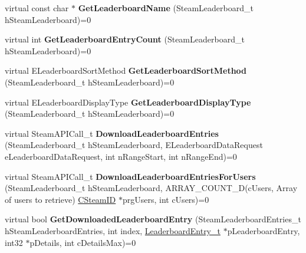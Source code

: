 \begin{DoxyCompactItemize}
\item 
\mbox{\label{class_i_steam_user_stats_a5b73997ec50e5789cc48a14b129eba62}} 
virtual const char $\ast$ {\bfseries Get\+Leaderboard\+Name} (Steam\+Leaderboard\+\_\+t h\+Steam\+Leaderboard)=0
\item 
\mbox{\label{class_i_steam_user_stats_a4c8c23b7cbc6ef50ab988e481d565282}} 
virtual int {\bfseries Get\+Leaderboard\+Entry\+Count} (Steam\+Leaderboard\+\_\+t h\+Steam\+Leaderboard)=0
\item 
\mbox{\label{class_i_steam_user_stats_a228d2fbf58844ec409e415a279ef42c1}} 
virtual E\+Leaderboard\+Sort\+Method {\bfseries Get\+Leaderboard\+Sort\+Method} (Steam\+Leaderboard\+\_\+t h\+Steam\+Leaderboard)=0
\item 
\mbox{\label{class_i_steam_user_stats_a82c755c4af5bb25d68a26be3d953091e}} 
virtual E\+Leaderboard\+Display\+Type {\bfseries Get\+Leaderboard\+Display\+Type} (Steam\+Leaderboard\+\_\+t h\+Steam\+Leaderboard)=0
\item 
\mbox{\label{class_i_steam_user_stats_ab96ab938a0416ec20023b6758311e358}} 
virtual Steam\+A\+P\+I\+Call\+\_\+t {\bfseries Download\+Leaderboard\+Entries} (Steam\+Leaderboard\+\_\+t h\+Steam\+Leaderboard, E\+Leaderboard\+Data\+Request e\+Leaderboard\+Data\+Request, int n\+Range\+Start, int n\+Range\+End)=0
\item 
\mbox{\label{class_i_steam_user_stats_a77830ffadf8e0fb44d56133aa9cc4b68}} 
virtual Steam\+A\+P\+I\+Call\+\_\+t {\bfseries Download\+Leaderboard\+Entries\+For\+Users} (Steam\+Leaderboard\+\_\+t h\+Steam\+Leaderboard, A\+R\+R\+A\+Y\+\_\+\+C\+O\+U\+N\+T\+\_\+D(c\+Users, Array of users to retrieve) \hyperlink{class_c_steam_i_d}{C\+Steam\+ID} $\ast$prg\+Users, int c\+Users)=0
\item 
\mbox{\label{class_i_steam_user_stats_ac0fac175af5dcca627a9a866156ecd73}} 
virtual bool {\bfseries Get\+Downloaded\+Leaderboard\+Entry} (Steam\+Leaderboard\+Entries\+\_\+t h\+Steam\+Leaderboard\+Entries, int index, \hyperlink{struct_leaderboard_entry__t}{Leaderboard\+Entry\+\_\+t} $\ast$p\+Leaderboard\+Entry, int32 $\ast$p\+Details, int c\+Details\+Max)=0

\end{DoxyCompactItemize}

